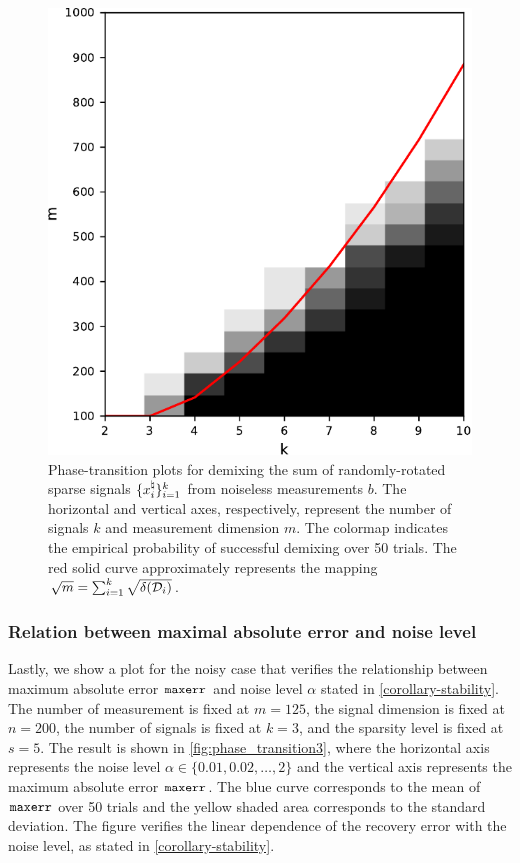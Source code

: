 \begin{figure}[t]
    \centering\small
    \includegraphics[width=.5\linewidth]{./figures/relation_m_k.pdf}
    \caption{Phase-transition plots for demixing the sum of randomly-rotated sparse signals $\{x_i^{\natural}\}_{i=1}^k$ from noiseless measurements $b$. The horizontal and vertical axes, respectively, represent the number of signals $k$ and measurement dimension $m$. The colormap indicates the empirical probability of successful demixing over 50 trials. The red solid curve approximately represents the mapping $\sqrt{m} = \sum_{i=1}^k \sqrt{\delta(\mathcal{D}_i)}$.}
    \label{fig:phase_transition2}
\end{figure}

\subsubsection{Relation between maximal absolute error and noise level}
Lastly, we show a plot for the noisy case that verifies the relationship between maximum absolute error $\mathop{\tt maxerr}$ and noise level $\alpha$ stated in \autoref{corollary-stability}. The number of measurement is fixed at $m=125$, the signal dimension is fixed at $n=200$, the number of signals is fixed at $k=3$, and the sparsity level is fixed at $s=5$. The result is shown in \autoref{fig:phase_transition3}, where the horizontal axis represents the noise level $\alpha\in\{0.01, 0.02, \dots, 2\}$ and the vertical axis represents the maximum absolute error $\mathop{\tt maxerr}$. The blue curve corresponds to the mean of $\mathop{\tt maxerr}$ over 50 trials and the yellow shaded area corresponds to the standard deviation. The figure verifies the linear dependence of the recovery error with the noise level, as stated in \autoref{corollary-stability}.

